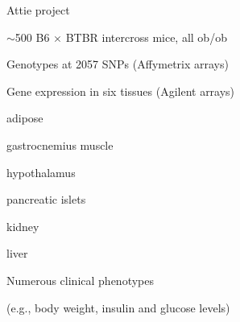 \documentclass[12pt]{article}
\newcommand{\headsize}{\fontsize{35}{35} \selectfont}
\newcommand{\smallsize}{\fontsize{25}{30} \selectfont}
\newcommand{\smallersize}{\fontsize{20}{25} \selectfont}
\newcommand{\smallestsize}{\fontsize{18}{22} \selectfont}
\begin{document}
\newpage

\headsize \color{myyellow}
\hfill 
\begin{minipage}{5.75in}
\centering
Attie project
\end{minipage}

\vspace{20mm}

\hfill \begin{minipage}{10in}

\smallsize
\color{mypink} 
$\sim$500 B6 $\times$ BTBR intercross mice, all ob/ob

\smallersize
\vspace{10mm}

\hfill \begin{minipage}{9in}
\color{mywhite}

Genotypes at 2057 SNPs (Affymetrix arrays)

\vspace{5mm}

Gene expression in six tissues (Agilent arrays)

{\color{myblue} \smallestsize
\hspace{20mm} adipose

\hspace{20mm} gastrocnemius muscle

\hspace{20mm}  hypothalamus

\hspace{20mm} pancreatic islets

\hspace{20mm} kidney

\hspace{20mm} liver
}
\vspace{5mm}

Numerous clinical phenotypes 

{\color{myblue}  \smallestsize
\hspace{20mm} (e.g., body weight, insulin and glucose
levels)
}

%
%
%
%



\end{minipage}

\end{minipage}
\end{document}
